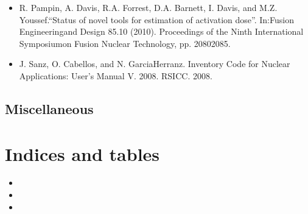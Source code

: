 \documentclass[letterpaper,10pt,english]{sphinxmanual}
\begin{document}
\begin{itemize}
\item {} 
\sphinxAtStartPar
R. Pampin, A. Davis, R.A. Forrest, D.A. Barnett, I. Davis, and M.Z. Youssef.“Status of novel
tools for estimation of activation dose”. In:Fusion Engineeringand Design 85.10 (2010).
Proceedings of the Ninth International Symposiumon Fusion Nuclear Technology, pp. 2080\textendash{}2085.

\item {} 
\sphinxAtStartPar
J. Sanz, O. Cabellos, and N. Garcia\sphinxhyphen{}Herranz. Inventory Code for Nuclear Applications:
User’s Manual V. 2008. RSICC. 2008.

\end{itemize}


\section{Miscellaneous}
\label{\detokenize{publications:miscellaneous}}

\chapter{Indices and tables}
\label{\detokenize{index:indices-and-tables}}\begin{itemize}
\item {} 
\sphinxAtStartPar
{}

\item {} 
\sphinxAtStartPar
{}

\item {} 
\sphinxAtStartPar
{}

\end{itemize}



\renewcommand{\indexname}{Index}
\printindex
\end{document}
